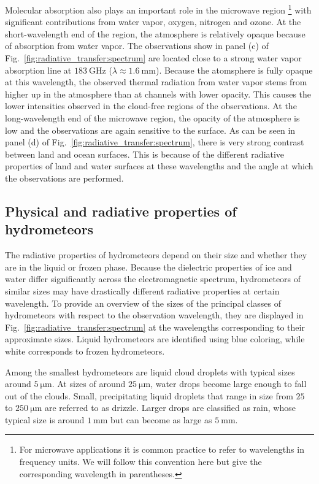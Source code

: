 Molecular absorption also plays an important role in the microwave region
\footnote{For microwave applications it is common
practice to refer to wavelengths in frequency units. We will follow this
convention here but give the corresponding wavelength in parentheses.}
with significant contributions from water vapor, oxygen, nitrogen and ozone. At
the short-wavelength end of the region, the atmosphere is relatively opaque
because of absorption from water vapor. The observations show in panel (c) of
Fig.~\ref{fig:radiative_transfer:spectrum} are located close to a strong water
vapor absorption line at $\SI{183}{\giga \hertz}$
($\lambda \approx \SI{1.6}{\milli \meter}$). Because the atomsphere is fully
opaque at this wavelength, the observed thermal radiation from water vapor stems from
higher up in the atmosphere than at channels with lower opacity. This causes the
lower intensities observed in the cloud-free regions of the observations. At the
long-wavelength end of the microwave region, the opacity of the atmosphere is
low and the observations are again sensitive to the surface. As can be seen in panel
(d) of Fig.~\ref{fig:radiative_transfer:spectrum}, there is very strong contrast
between land and ocean surfaces. This is because of the different radiative
properties of land and water surfaces at these wavelengths and the angle
at which the observations are performed.

\subsection{Physical and radiative properties of hydrometeors}

The radiative properties of hydrometeors depend on their size and whether they
are in the liquid or frozen phase. Because the dielectric properties of ice and
water differ significantly across the electromagnetic spectrum, hydrometeors of
similar sizes may have drastically different radiative properties at certain
wavelength. To provide an overview of the sizes of the principal classes of
hydrometeors with respect to the observation wavelength, they are displayed in
Fig.~\ref{fig:radiative_transfer:spectrum} at the wavelengths corresponding to
their approximate sizes. Liquid hydrometeors are identified using blue coloring,
while white corresponds to frozen hydrometeors.

Among the smallest hydrometeors are liquid cloud droplets with typical sizes
around $\SI{5}{\micro \meter}$. At sizes of around $\SI{25}{\micro \meter}$,
water drops become large enough to fall out of the clouds. Small, precipitating
liquid droplets that range in size from $25$ to $\SI{250}{\micro \meter}$ are
referred to as drizzle. Larger drops are classified as rain, whose typical
size is around $\SI{1}{\milli \meter}$ but can become as large as
$\SI{5}{\milli \meter}$.

